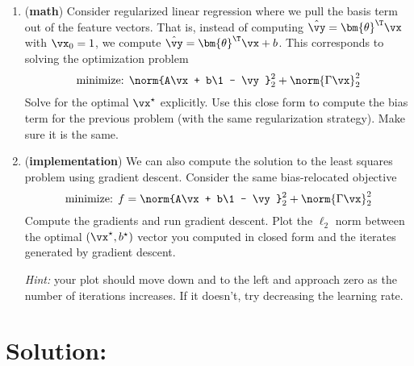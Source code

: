 \documentclass[189]{pset}
\begin{document}
\begin{enumerate}
  \item (\textbf{math}) Consider regularized linear regression where
    we pull the basis term out of the feature vectors. That is,
    instead of computing $\hat\vy = \bm{\theta}^\T\vx$ with $\vx_0 =
    1$, we compute $\hat\vy = \bm{\theta}^\T\vx + b$. This corresponds
    to solving the optimization problem
    \[
      \text{minimize: } \norm{A\vx + b\1 - \vy}_2^2 + \norm{\Gamma \vx}_2^2
    \]
    Solve for the optimal $\vx^\star$ explicitly. Use this close form
    to compute the bias term for the previous problem (with the same
    regularization strategy). Make sure it is the same.
  \item (\textbf{implementation}) We can also compute the solution to
    the least squares problem using gradient descent. Consider the
    same bias-relocated objective
    \[
      \text{minimize: } f = \norm{A\vx + b\1 - \vy}_2^2 + \norm{\Gamma
      \vx}_2^2
    \]
    Compute the gradients and run gradient descent. Plot the $\ell_2$
    norm between the optimal $(\vx^\star, b^\star)$ vector you
    computed in closed form and the iterates generated by gradient
    descent.

    \textit{Hint:} your plot should move down and to the left and
    approach zero as the number of iterations increases. If it
    doesn't, try decreasing the learning rate.
  \end{enumerate}

  \hrulefill

  \clearpage

  \section*{Solution:}
\end{document}
